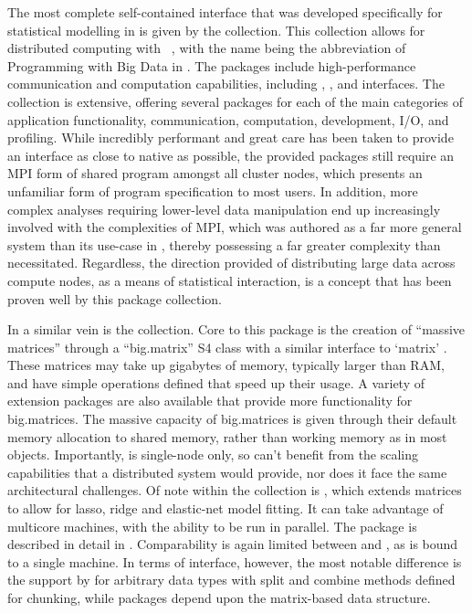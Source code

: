 \documentclass[letterpaper, inpress]{jds} %
\begin{document}
The most complete self-contained interface that was developed specifically for statistical modelling in  is given by the  collection.
This collection allows for distributed computing with ~\citep{pbdBASEpackage}, with the name being the abbreviation of Programming with Big Data in .
The packages include high-performance communication and computation capabilities, including , , and  interfaces.
The collection is extensive, offering several packages for each of the main categories of application functionality, communication, computation, development, I/O, and profiling.
While incredibly performant and great care has been taken to provide an interface as close to native  as possible, the provided packages still require an MPI form of shared program amongst all cluster nodes, which presents an unfamiliar form of program specification to most  users.
In addition, more complex analyses requiring lower-level data manipulation end up increasingly involved with the complexities of MPI, which was authored as a far more general system than its use-case in , thereby possessing a far greater complexity than necessitated.
Regardless, the direction provided of distributing large data across compute nodes, as a means of statistical interaction, is a concept that has been proven well by this package collection.

In a similar vein is the  collection.
Core to this package is the creation of ``massive matrices'' through a ``big.matrix'' S4 class with a similar interface to `matrix' \citep{kane13:bigmemory}.
These matrices may take up gigabytes of memory, typically larger than RAM, and have simple operations defined that speed up their usage.
A variety of extension packages are also available that provide more functionality for big.matrices.
The massive capacity of big.matrices is given through their default memory allocation to shared memory, rather than working memory as in most  objects.
Importantly,  is single-node only, so can't benefit from the scaling capabilities that a distributed system would provide, nor does it face the same architectural challenges.
Of note within the  collection is , which extends  matrices to allow for lasso, ridge and elastic-net model fitting.
It can take advantage of multicore machines, with the ability to be run in parallel. The package  is described in detail in \citet{zeng2017biglasso}.
Comparability is again limited between  and , as  is bound to a single machine.
In terms of interface, however, the most notable difference is the support by  for arbitrary data types with split and combine methods defined for chunking, while  packages depend upon the matrix-based data structure.
\end{document}

